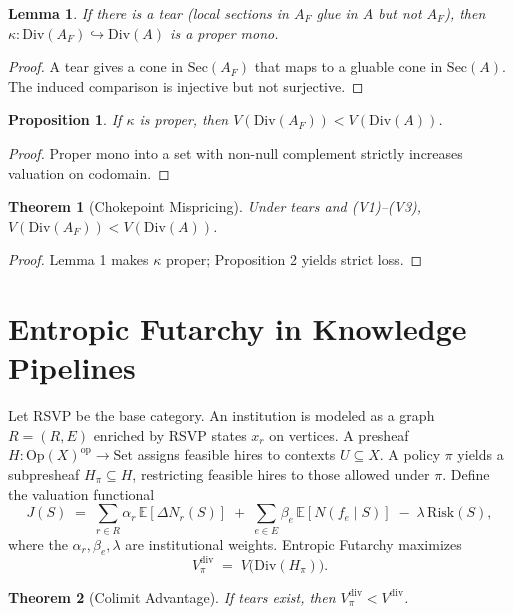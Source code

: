 \documentclass[12pt]{article}
\newtheorem{theorem}{Theorem}
\newtheorem{lemma}{Lemma}
\newtheorem{proposition}{Proposition}
\theoremstyle{remark}
\begin{document}
\begin{lemma}
If there is a tear (local sections in $A_F$ glue in $A$ but not $A_F$), then $\kappa: \mathrm{Div}(A_F) \hookrightarrow \mathrm{Div}(A)$ is a proper mono.
\end{lemma}

\begin{proof}
A tear gives a cone in $\mathrm{Sec}(A_F)$ that maps to a gluable cone in $\mathrm{Sec}(A)$. The induced comparison is injective but not surjective.
\end{proof}

\begin{proposition}
If $\kappa$ is proper, then $V(\mathrm{Div}(A_F)) < V(\mathrm{Div}(A))$.
\end{proposition}

\begin{proof}
Proper mono into a set with non-null complement strictly increases valuation on codomain.
\end{proof}

\begin{theorem}[Chokepoint Mispricing]
Under tears and (V1)--(V3), $V(\mathrm{Div}(A_F)) < V(\mathrm{Div}(A))$.
\end{theorem}

\begin{proof}
Lemma 1 makes $\kappa$ proper; Proposition 2 yields strict loss.
\end{proof}

\section{Entropic Futarchy in Knowledge Pipelines}
\label{app:futarchy}
Let RSVP be the base category. 
An institution is modeled as a graph $R=(R,E)$ enriched by RSVP states $x_r$ on vertices. 
A presheaf $H:\mathrm{Op}(X)^{\mathrm{op}}\to\mathrm{Set}$ assigns feasible hires to contexts $U\subseteq X$. 
A policy $\pi$ yields a subpresheaf $H_\pi\subseteq H$, restricting feasible hires to those allowed under $\pi$. 
Define the valuation functional
\[
J(S) \;=\; \sum_{r\in R} \alpha_r \,\mathbb{E}[\Delta N_r(S)] \;+\; \sum_{e\in E} \beta_e \,\mathbb{E}[N(f_e\mid S)] \;-\; \lambda \,\mathrm{Risk}(S),
\]
where the $\alpha_r,\beta_e,\lambda$ are institutional weights. 
Entropic Futarchy maximizes
\[
V_\pi^{\mathrm{div}} \;=\; V\big(\mathrm{Div}(H_\pi)\big).
\]

\begin{theorem}[Colimit Advantage]
If tears exist, then $V_\pi^{\mathrm{div}} < V^{\mathrm{div}}$.
\end{theorem}
\end{document}
